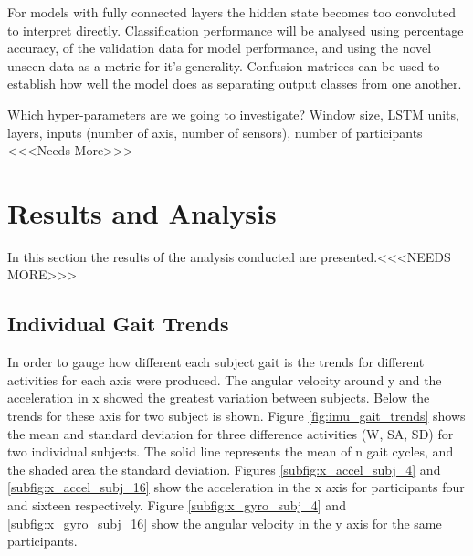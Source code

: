 \documentclass[sensors,article,submit,moreauthors,pdftex]{Definitions/mdpi}
\begin{document}
For models with fully connected layers the hidden state becomes too convoluted to interpret directly. Classification performance will be analysed using percentage accuracy, of the validation data for model performance, and using the novel unseen data as a metric for it's generality. Confusion matrices can be used to establish how well the model does as separating output classes from one another.

Which hyper-parameters are we going to investigate? Window size, LSTM units, layers, inputs (number of axis, number of sensors), number of participants <<<Needs More>>>

\section{Results and Analysis}
In this section the results of the analysis conducted are presented.<<<NEEDS MORE>>>

\subsection{Individual Gait Trends}
In order to gauge how different each subject gait is the trends for different activities for each axis were produced. The angular velocity around y and the acceleration in x showed the greatest variation between subjects. Below the trends for these axis for two subject is shown. Figure \ref{fig:imu_gait_trends} shows the mean and standard deviation for three difference activities (W, SA, SD) for two individual subjects. The solid line represents the mean of n gait cycles, and the shaded area the standard deviation. Figures \ref{subfig:x_accel_subj_4} and \ref{subfig:x_accel_subj_16} show the acceleration in the x axis for participants four and sixteen respectively. Figure \ref{subfig:x_gyro_subj_4} and \ref{subfig:x_gyro_subj_16} show the angular velocity in the y axis for the same participants.
\end{document}
